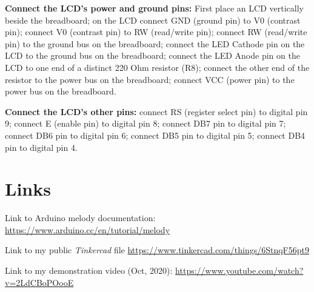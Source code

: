 \documentclass[a4paper]{article}
\begin{document}
\noindent \textbf{Connect the LCD’s power and ground pins:} First place an LCD vertically beside the breadboard; on the LCD connect GND (ground pin) to V0 (contrast pin); connect V0 (contrast pin) to RW (read/write pin); connect RW (read/write pin) to the ground bus on the breadboard; connect the LED Cathode pin on the LCD to the ground bus on the breadboard; connect the LED Anode pin on the LCD to one end of a distinct 220 Ohm resistor (R8); connect the other end of the resistor to the power bus on the breadboard; connect VCC (power pin) to the power bus on the breadboard.

\noindent \textbf{Connect the LCD’s other pins:} connect RS (register select pin) to digital pin 9; connect E (enable pin) to digital pin 8; connect DB7 pin to digital pin 7; connect DB6 pin to digital pin 6; connect DB5 pin to digital pin 5; connect DB4 pin to digital pin 4.

\section{Links}\label{sec:links}

\noindent Link to Arduino melody documentation: \url{https://www.arduino.cc/en/tutorial/melody}

\noindent Link to my public \emph{Tinkercad} file \url{https://www.tinkercad.com/things/6StnqF56pt9}

\noindent Link to my demonstration video (Oct, 2020): \url{https://www.youtube.com/watch?v=2LdCBoPOooE}
\end{document}
